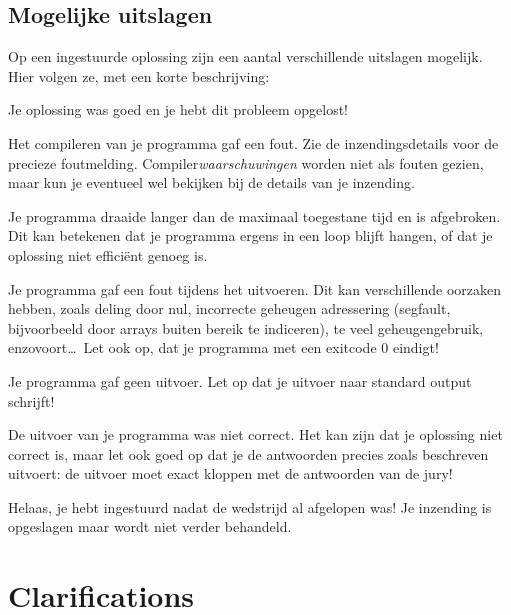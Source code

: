 \subsection{Mogelijke uitslagen}

Op een ingestuurde oplossing zijn een aantal verschillende uitslagen
mogelijk. Hier volgen ze, met een korte beschrijving:

\begin{description}[\setleftmargin{4.5cm}]
\item[CORRECT]
Je oplossing was goed en je hebt dit probleem opgelost!

\item[COMPILER-ERROR]
Het compileren van je programma gaf een fout. Zie de inzendingsdetails
voor de precieze foutmelding. Compiler\emph{waarschuwingen} worden
niet als fouten gezien, maar kun je eventueel wel bekijken bij de
details van je inzending.

\item[TIMELIMIT]
Je programma draaide langer dan de maximaal toegestane tijd en is
afgebroken. Dit kan betekenen dat je programma ergens in een loop
blijft hangen, of dat je oplossing niet effici\"ent genoeg is.

\item[RUN-ERROR]
Je programma gaf een fout tijdens het uitvoeren. Dit kan verschillende
oorzaken hebben, zoals deling door nul, incorrecte geheugen adressering
(segfault, bijvoorbeeld door arrays buiten bereik te indiceren), te
veel geheugengebruik, enzovoort\dots\ 
Let ook op, dat je programma met een exitcode 0 eindigt!

\item[NO-OUTPUT]
Je programma gaf geen uitvoer. Let op dat je uitvoer naar standard
output schrijft!

\item[WRONG-ANSWER]
De uitvoer van je programma was niet correct. Het kan zijn dat je
oplossing niet correct is, maar let ook goed op dat je de antwoorden
precies zoals beschreven uitvoert: de uitvoer moet exact kloppen met
de antwoorden van de jury!

\item[TOO-LATE]
Helaas, je hebt ingestuurd nadat de wedstrijd al afgelopen was!
Je inzending is opgeslagen maar wordt niet verder behandeld.
\end{description}

\section{Clarifications}

